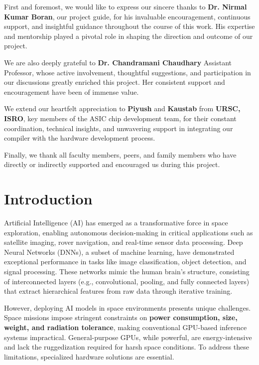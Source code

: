 \documentclass[12pt]{report}
\begin{document}
\begin{spacing}{1.01}
First and foremost, we would like to express our sincere thanks to \textbf{Dr. Nirmal Kumar Boran}, our project guide, for his invaluable encouragement, continuous support, and insightful guidance throughout the course of this work. His expertise and mentorship played a pivotal role in shaping the direction and outcome of our project.

We are also deeply grateful to \textbf{Dr. Chandramani Chaudhary} Assistant Professor, whose active involvement, thoughtful suggestions, and participation in our discussions greatly enriched this project. Her consistent support and encouragement have been of immense value.

We extend our heartfelt appreciation to \textbf{Piyush} and \textbf{Kaustab} from \textbf{URSC, ISRO}, key members of the ASIC chip development team, for their constant coordination, technical insights, and unwavering support in integrating our compiler with the hardware development process.

Finally, we thank all faculty members, peers, and family members who have directly or indirectly supported and encouraged us during this project.
\vspace{4.0mm}
\tableofcontents
{}
\end{spacing}
\listoffigures
\listoftables
\vspace{-2 em}
\printglossary[nonumberlist]



\chapter{Introduction}

Artificial Intelligence (AI) has emerged as a transformative force in space exploration, enabling autonomous decision-making in critical applications such as satellite imaging, rover navigation, and real-time sensor data processing. Deep Neural Networks (DNNs), a subset of machine learning, have demonstrated exceptional performance in tasks like image classification, object detection, and signal processing. These networks mimic the human brain's structure, consisting of interconnected layers (e.g., convolutional, pooling, and fully connected layers) that extract hierarchical features from raw data through iterative training.

However, deploying AI models in space environments presents unique challenges. Space missions impose stringent constraints on \textbf{power consumption, size, weight, and radiation tolerance}, making conventional GPU-based inference systems impractical. General-purpose GPUs, while powerful, are energy-intensive and lack the ruggedization required for harsh space conditions. To address these limitations, specialized hardware solutions are essential.
\end{document}

